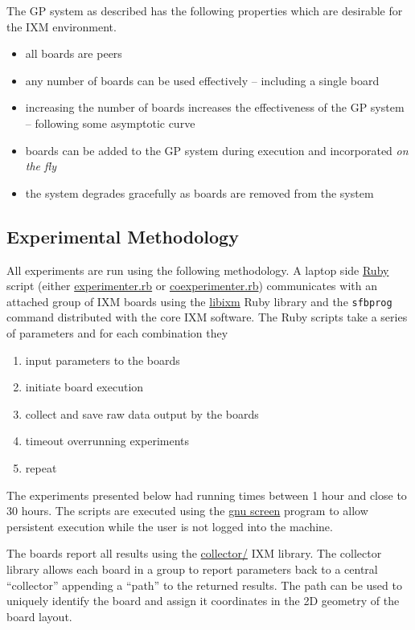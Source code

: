 \documentclass[11pt]{article}
\begin{document}
The GP system as described has the following properties which are
desirable for the IXM environment.
\begin{itemize}
\item all boards are peers
\item any number of boards can be used effectively -- including a single
  board
\item increasing the number of boards increases the effectiveness of the
  GP system -- following some asymptotic curve
\item boards can be added to the GP system during execution and
  incorporated \emph{on the fly}
\item the system degrades gracefully as boards are removed from the system
\end{itemize}

\subsection*{Experimental Methodology}
\label{sec-1.4}

All experiments are run using the following methodology.  A laptop
side \href{http://www.ruby-lang.org/en/}{Ruby} script (either \href{file:///nfs/adaptive/eschulte/src/gp4ixm-report/src/experimenter.rb}{experimenter.rb} or \href{file:///nfs/adaptive/eschulte/src/gp4ixm-report/src/coexperimenter.rb}{coexperimenter.rb})
communicates with an attached group of IXM boards using the \href{http://github.com/mixonic/libixm}{libixm}
Ruby library and the \texttt{sfbprog} command distributed with the core IXM
software.  The Ruby scripts take a series of parameters and for each
combination they
\begin{enumerate}
\item input parameters to the boards
\item initiate board execution
\item collect and save raw data output by the boards
\item timeout overrunning experiments
\item repeat
\end{enumerate}

The experiments presented below had running times between 1 hour and
close to 30 hours.  The scripts are executed using the \href{http://www.gnu.org/software/screen/}{gnu screen}
program to allow persistent execution while the user is not logged
into the machine.

The boards report all results using the \href{file:///nfs/adaptive/eschulte/src/gp4ixm-report/src/collector/}{collector/} IXM library.  The
collector library allows each board in a group to report parameters
back to a central ``collector'' appending a ``path'' to the returned
results.  The path can be used to uniquely identify the board and
assign it coordinates in the 2D geometry of the board layout.
\end{document}
